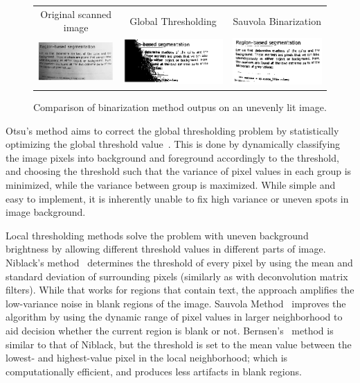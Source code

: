 \begin{figure}
\centering
{\sffamily
\begin{tabular}{ccc}
Original scanned image &
Global Thresholding &
Sauvola Binarization \\
\includegraphics[width=.3\linewidth]{img/preprocessing/bin_orig.png} &
\includegraphics[width=.3\linewidth]{img/preprocessing/bin_glob.png} &
\includegraphics[width=.3\linewidth]{img/preprocessing/bin_sauvola.png}
\end{tabular}
}
\caption{Comparison of binarization method outpus on an unevenly lit image.}
\label{fig:thresholds}
\end{figure}

Otsu's method aims to correct the global thresholding problem by statistically optimizing the global threshold value~\citep{otsu}. This is done by dynamically classifying the image pixels into background and foreground accordingly to the threshold, and choosing the threshold such that the variance of pixel values in each group is minimized, while the variance between group is maximized. While simple and easy to implement, it is inherently unable to fix high variance or uneven spots in image background.

Local thresholding methods solve the problem with uneven background brightness by allowing different threshold values in different parts of image. Niblack's method~\citep{adaptiveBin} determines the threshold of every pixel by using the mean and standard deviation of surrounding pixels (similarly as with deconvolution matrix filters). While that works for regions that contain text, the approach amplifies the low-variance noise in blank regions of the image. Sauvola Method~\citep{adaptiveBin} improves the algorithm by using the dynamic range of pixel values in larger neighborhood to aid decision whether the current region is blank or not. Bernsen's~\citep{adaptiveBin} method is similar to that of Niblack, but the threshold is set to the mean value between the lowest- and highest-value pixel in the local neighborhood; which is computationally efficient, and produces less artifacts in blank regions.

